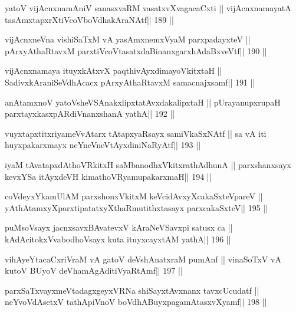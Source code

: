 \begin{shl}
yatoV vijAcnxnamAniV sanasxvaRM vasatxvXvagacaCxti ||
vijAcnxnamayatA tasAmxtapxrXtiVcoV\s boVdhakAraNAtf\hfill || 189 ||
\end{shl}

\begin{shl}
vijAcnxneVna vishiSaTxM vA yasAmxnemxVyaM parxpadayxteV ||
pArxyAthaRtavxM parxtiVcoV\s tasatxdaBinanxgarxhAdaBxveVtf\hfill || 190 ||
\end{shl}

\begin{shl}
vijAcnxnamaya ituyxkAtxvX paqthivAyxdimayoVkitxtaH ||
SadivxkAraniSeVdhAcacx pArxyAthaRtavxM samacnajxsamf\hfill || 191 ||
\end{shl}

\begin{shl}
anAtamxnoV yatoV\s sheVSAnakxlipxtatAvxdakalipxtaH ||
pUrayanupxrupaH parxtayxkasxpARdiVnanxshanA yathA\hfill || 192 ||
\end{shl}

\begin{shl}
vuyxtapxtitxriyameVvAtarx tAtapxyaRsayx samiVkaSxNAtf ||
sa vA iti huyxpakarxmayx neYneVneVtAyxdiniNaRyAtf\hfill || 193 ||
\end{shl}

\begin{shl}
iyaM tAvatapxdAthoVRkitxH saMbanodhxVkitxrathAdhunA ||
parxshanxsayx kevxYSa itAyxdeVH kimathoVR\s yamupakarxmaH\hfill || 194 ||
\end{shl}

\begin{shl}
coVdeyxYkamUlAM parxshonxVkitxM keVcidAvxyXcakaSxteV\s pareV ||
yAthAtamxyXparxtipatatxyXthaRmutithxtasayx parxcakaSxteV\hfill || 195 ||
\end{shl}

\begin{shl}
puMsoV\s sayx jacnxsavxBAvatevxV kAraNeVSavxpi satusx ca ||
kAdAcitokxV\s vabodhoV\s sayx kuta ituyxcayxtAM yathA\hfill || 196 ||
\end{shl}

\begin{shl}
vihAyeYtacaCxriVraM vA gatoV deVshAnatxraM pumAnf ||
vinaSoTxV vA kutoV BUyoV deVhamAgAditiVyaRtAmf\hfill || 197 ||
\end{shl}

\begin{shl}
parxSaTxvayxmeVtadagxgeyxVRNa shiSayxtAvxnanx tavxcUcudatf ||
neYvoVdAsetxV tathA\s piVnoV boVdhABuyxpagamAtasxvXyamf\hfill || 198 ||
\end{shl}

